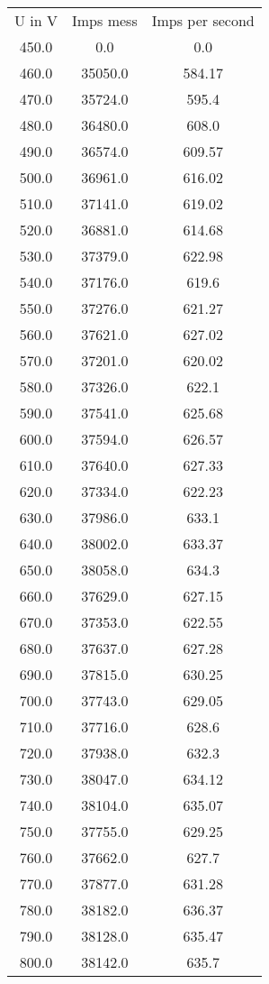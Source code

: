\begin{table}
\begin{tabular}{ccc}
U in V & Imps mess & Imps per second \\
450.0 & 0.0 & 0.0 \\
460.0 & 35050.0 & 584.17 \\
470.0 & 35724.0 & 595.4 \\
480.0 & 36480.0 & 608.0 \\
490.0 & 36574.0 & 609.57 \\
500.0 & 36961.0 & 616.02 \\
510.0 & 37141.0 & 619.02 \\
520.0 & 36881.0 & 614.68 \\
530.0 & 37379.0 & 622.98 \\
540.0 & 37176.0 & 619.6 \\
550.0 & 37276.0 & 621.27 \\
560.0 & 37621.0 & 627.02 \\
570.0 & 37201.0 & 620.02 \\
580.0 & 37326.0 & 622.1 \\
590.0 & 37541.0 & 625.68 \\
600.0 & 37594.0 & 626.57 \\
610.0 & 37640.0 & 627.33 \\
620.0 & 37334.0 & 622.23 \\
630.0 & 37986.0 & 633.1 \\
640.0 & 38002.0 & 633.37 \\
650.0 & 38058.0 & 634.3 \\
660.0 & 37629.0 & 627.15 \\
670.0 & 37353.0 & 622.55 \\
680.0 & 37637.0 & 627.28 \\
690.0 & 37815.0 & 630.25 \\
700.0 & 37743.0 & 629.05 \\
710.0 & 37716.0 & 628.6 \\
720.0 & 37938.0 & 632.3 \\
730.0 & 38047.0 & 634.12 \\
740.0 & 38104.0 & 635.07 \\
750.0 & 37755.0 & 629.25 \\
760.0 & 37662.0 & 627.7 \\
770.0 & 37877.0 & 631.28 \\
780.0 & 38182.0 & 636.37 \\
790.0 & 38128.0 & 635.47 \\
800.0 & 38142.0 & 635.7 \\

\end{tabular}
\end{table}
